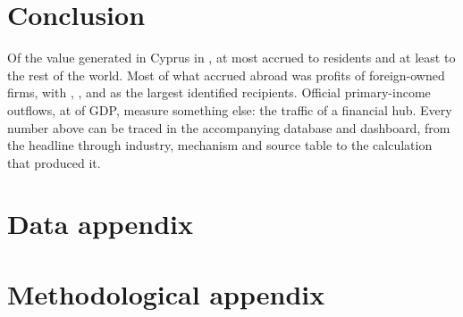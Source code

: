 \documentclass[11pt]{article}
\begin{document}
\section{Conclusion}
\label{sec:conclusion}

Of the value generated in Cyprus in \LastYear{}, at most \DVRLast{} accrued to residents and at least \FVLLast{} to the rest of the world.
Most of what accrued abroad was profits of foreign-owned firms, with \RecOneName{}, \RecTwoName{}, \RecThreeName{} and \RecFourName{} as the largest identified recipients.
Official primary-income outflows, at \OfficialOutLast{} of GDP, measure something else: the traffic of a financial hub.
Every number above can be traced in the accompanying database and dashboard, from the headline through industry, mechanism and source table to the calculation that produced it.




\appendix
\section{Data appendix}
\label{app:data}


\section{Methodological appendix}
\label{app:method}



\end{document}
